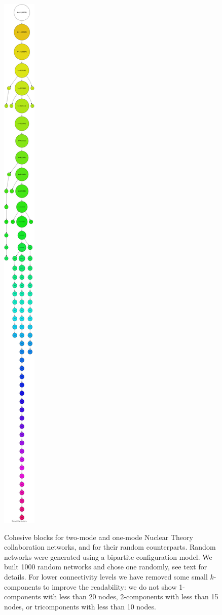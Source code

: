 \begin{landscape}
\begin{figure}[p]
{\includegraphics[scale=0.07]{figures/cohesive_blocks_nucl_th_1mode_random}
}

\caption[Cohesive blocks for two-mode and one-mode Science networks.]{Cohesive blocks for two-mode and one-mode Nuclear Theory collaboration networks, and for their random counterparts. Random networks were generated using a bipartite configuration model. We built 1000 random networks and chose one randomly, see text for details. For lower connectivity levels we have removed some small $k$-components to improve the readability: we do not show 1-components with less than 20 nodes, 2-components with less than 15 nodes, or tricomponents with less than 10 nodes.}
\label{fig:cb_nucl_all}
\end{figure}
\end{landscape}

